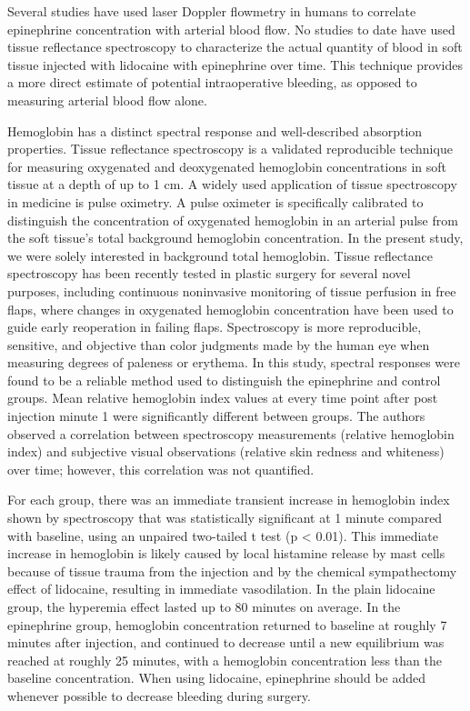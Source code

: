 Several studies have used laser Doppler flowmetry in humans to correlate epinephrine concentration with arterial blood flow.\cite{Dunlevy1996,OMalley1995} No studies to date have used tissue reflectance spectroscopy to characterize the actual quantity of blood in soft tissue injected with lidocaine with epinephrine over time. This technique provides a more direct estimate of potential intraoperative bleeding, as opposed to measuring arterial blood flow alone.

Hemoglobin has a distinct spectral response and well-described absorption properties. Tissue reflectance spectroscopy is a validated reproducible technique for measuring oxygenated and deoxygenated hemoglobin concentrations in soft tissue at a depth of up to 1 cm.\cite{Dawson1980,Wilson2008} A widely used application of tissue spectroscopy in medicine is pulse oximetry. A pulse oximeter is specifically calibrated to distinguish the concentration of oxygenated hemoglobin in an arterial pulse from the soft tissue's total background hemoglobin concentration. In the present study, we were solely interested in background total hemoglobin. Tissue reflectance spectroscopy has been recently tested in plastic surgery for several novel purposes, including continuous noninvasive monitoring of tissue perfusion in free flaps, where changes in oxygenated hemoglobin concentration have been used to guide early reoperation in failing flaps.\cite{Najefi2010,Stelle2011} Spectroscopy is more reproducible, sensitive, and objective than color judgments made by the human eye when measuring degrees of paleness or erythema. In this study, spectral responses were found to be a reliable method used to distinguish the epinephrine and control groups. Mean relative hemoglobin index values at every time point after post injection minute 1 were significantly different between groups. The authors observed a correlation between spectroscopy measurements (relative hemoglobin index) and subjective visual observations (relative skin redness and whiteness) over time; however, this correlation was not quantified.

For each group, there was an immediate transient increase in hemoglobin index shown by spectroscopy that was statistically significant at 1 minute compared with baseline, using an unpaired two-tailed t test (p < 0.01). This immediate increase in hemoglobin is likely caused by local histamine release by mast cells because of tissue trauma from the injection and by the chemical sympathectomy effect of lidocaine, resulting in immediate vasodilation. In the plain lidocaine group, the hyperemia effect lasted up to 80 minutes on average. In the epinephrine group, hemoglobin concentration returned to baseline at roughly 7 minutes after injection, and continued to decrease until a new equilibrium was reached at roughly 25 minutes, with a hemoglobin concentration less than the baseline concentration. When using lidocaine, epinephrine should be added whenever possible to decrease bleeding during surgery.\cite{Higgins,Lalonde2011}


